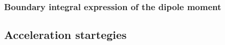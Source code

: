 \subsubsection{Boundary integral expression of the dipole moment}



\subsection{Acceleration startegies} \label{sec:acc_strategies}













